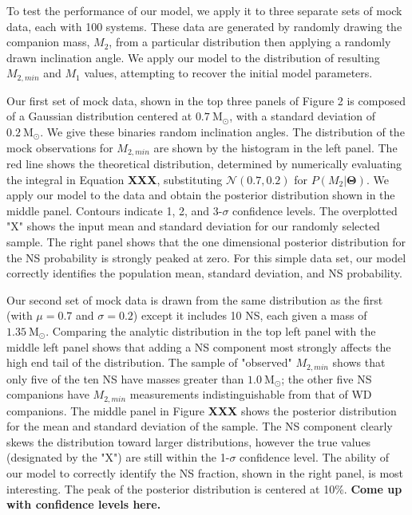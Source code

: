 \documentclass[letterpaper,12pt,preprint]{aastex}
\newcommand{\Msun}{\mathrm{M}_\odot}
\begin{document}
To test the performance of our model, we apply it to three separate sets of mock data, each with 100 systems. These data are generated by randomly drawing the companion mass, $M_2$, from a particular distribution then applying a randomly drawn inclination angle. We apply our model to the distribution of resulting $M_{2,min}$ and $M_1$ values, attempting to recover the initial model parameters.

Our first set of mock data, shown in the top three panels of Figure 2 is composed of a Gaussian distribution centered at $0.7~\Msun$, with a standard deviation of $0.2~\Msun$. We give these binaries random inclination angles. The distribution of the mock observations for $M_{2,min}$ are shown by the histogram in the left panel. The red line shows the theoretical distribution, determined by numerically evaluating the integral in Equation {\bf XXX}, substituting $\mathcal{N}(0.7,0.2)$ for $P(M_2|\mathbf{\Theta})$. We apply our model to the data and obtain the posterior distribution shown in the middle panel. Contours indicate 1, 2, and 3-$\sigma$ confidence levels. The overplotted "X" shows the input mean and standard deviation for our randomly selected sample. The right panel shows that the one dimensional posterior distribution for the NS probability is strongly peaked at zero. For this simple data set, our model correctly identifies the population mean, standard deviation, and NS probability. 

Our second set of mock data is drawn from the same distribution as the first (with $\mu = 0.7$ and $\sigma = 0.2$) except it includes 10 NS, each given a mass of $1.35~\Msun$. Comparing the analytic distribution in the top left panel with the middle left panel shows that adding a NS component most strongly affects the high end tail of the distribution. The sample of "observed" $M_{2,min}$ shows that only five of the ten NS have masses greater than $1.0~\Msun$; the other five NS companions have $M_{2,min}$ measurements indistinguishable from that of WD companions. The middle panel in Figure {\bf XXX} shows the posterior distribution for the mean and standard deviation of the sample. The NS component clearly skews the distribution toward larger distributions, however the true values (designated by the "X") are still within the 1-$\sigma$ confidence level. The ability of our model to correctly identify the NS fraction, shown in the right panel, is most interesting. The peak of the posterior distribution is centered at 10\%. {\bf Come up with confidence levels here.}
\end{document}
